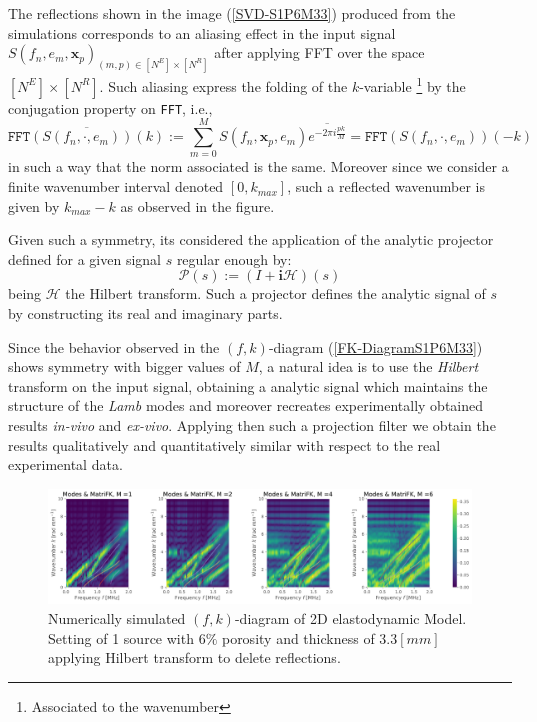 The reflections shown in the image (\ref{SVD-S1P6M33}) produced from the simulations corresponds to an aliasing effect in the input signal $S(f_n, e_m, \mathbf{x}_p)_{(m,p) \in [N^E]\times [N^R]}$ after applying FFT over the space $[N^E] \times [N^R]$. Such aliasing express the folding of the $k$-variable \footnote{Associated to the wavenumber} by the conjugation property on \texttt{FFT}, i.e., 
\begin{equation*}
    \overline{\texttt{FFT}(S(f_n, \cdot, e_m))(k)} := \sum_{m=0}^M S(f_n, \mathbf{x}_p, e_m) \overline{e^{-2 \pi i \frac{p k}{M}}} = \texttt{FFT}(S(f_n, \cdot, e_m))(-k)
\end{equation*}
in such a way that the norm associated is the same. Moreover since we consider a finite wavenumber interval denoted $[0, k_{max}]$, such a reflected wavenumber is given by $k_{max}-k$ as observed in the figure.

Given such a symmetry, its considered the application of the analytic projector defined for a given signal $s$ regular enough by:
\begin{equation*}
    \mathcal{P}(s) := (I + \mathbf{i}\mathcal{H})(s)
\end{equation*}
being $\mathcal{H}$ the Hilbert transform. Such a projector defines the analytic signal of $s$ by constructing its real and imaginary parts.

Since the behavior observed in the $(f,k)$-diagram (\ref{FK-DiagramS1P6M33}) shows symmetry with bigger values of $M$, a natural idea is to use the \textit{Hilbert} transform on the input signal, obtaining a analytic signal which maintains the structure of the \textit{Lamb} modes and moreover recreates experimentally obtained results \textit{in-vivo} and \textit{ex-vivo}.
Applying then such a projection filter we obtain the results qualitatively and quantitatively similar with respect to the real experimental data.

\begin{figure}[!h]
	\centering
	\includegraphics[width=\textwidth]{images/TimeSingSous/2DTimeHilb_P6ElasticFK33M1460_y.pdf}
	\caption{Numerically simulated $(f,k)$-diagram of 2D elastodynamic Model. Setting of 1 source with $6\%$ porosity and thickness of $3.3 [mm]$ applying Hilbert transform to delete reflections.}
	\label{FK-Hil-DiagramS1P6M33}
\end{figure} 

